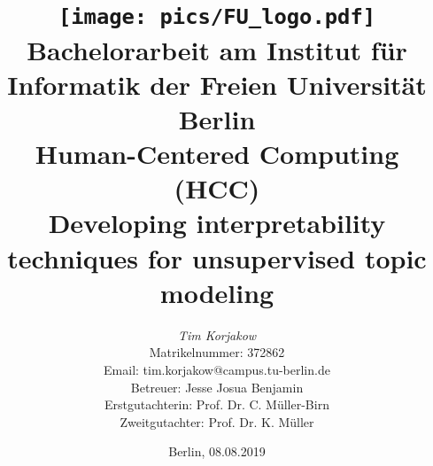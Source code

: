 %
\begin{titlepage}

\title{\texttt{[image: pics/FU\_logo.pdf]}\\
{\small Bachelorarbeit am Institut für Informatik der Freien Universität Berlin}\\
{\small Human-Centered Computing (HCC)}\\
[6ex]
{\LARGE Developing interpretability techniques for unsupervised topic modeling}}

\author{
{\emph{\normalsize Tim Korjakow}}\\
{\normalsize Matrikelnummer: 372862}\\
{\normalsize Email: tim.korjakow@campus.tu-berlin.de}\\ 
[18ex]   
{\normalsize Betreuer: Jesse Josua Benjamin} \\
{\normalsize Erstgutachterin: Prof. Dr. C. Müller-Birn} \\
{\normalsize Zweitgutachter: Prof. Dr. K. Müller}}
\vspace{6ex}
\date{\normalsize Berlin, 08.08.2019}
 
\maketitle  

\end{titlepage}